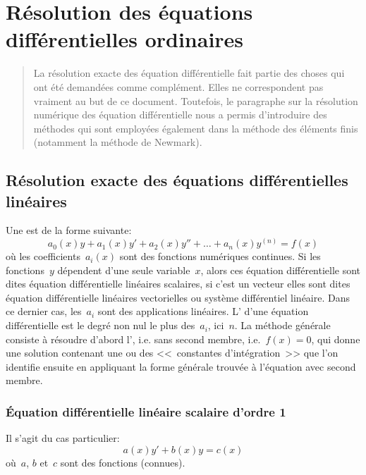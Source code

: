 \chapter{Résolution des équations différentielles ordinaires}\label{Ch-ED} 
\begin{abstract} La résolution exacte des équation différentielle fait partie des choses qui ont été demandées comme complément. Elles ne correspondent pas vraiment au but de ce document. Toutefois, le paragraphe sur la résolution numérique des équation différentielle nous a permis d'introduire des méthodes qui sont employées également dans la méthode des éléments finis (notamment la méthode de Newmark). 
\end{abstract} 
\section{Résolution exacte des équations différentielles linéaires} Une  est de la forme suivante:
\begin{equation}
a_0(x) y + a_1(x) y' + a_2(x) y'' + \ldots + a_n(x) y^{(n)}= f(x)
\end{equation}
où les coefficients~$a_i(x)$ sont des fonctions numériques continues. Si les fonctions~$y$ dépendent d'une seule variable~$x$, alors ces équation différentielle sont dites équation différentielle linéaires scalaires, si c'est un vecteur elles sont dites équation différentielle linéaires vectorielles ou système différentiel linéaire. Dans ce dernier cas, les~$a_i$ sont des applications linéaires. L' d'une équation différentielle est le degré non nul le plus des~$a_i$, ici~$n$. 
 La méthode générale consiste à résoudre d'abord l', i.e. sans second membre, i.e.~$f(x)=0$, qui donne une solution contenant une ou des <<~constantes d'intégration~>> que l'on identifie ensuite en appliquant la forme générale trouvée à l'équation avec second membre. 
 
\subsection{Équation différentielle linéaire scalaire d'ordre 1} 
Il s'agit du cas particulier:
\begin{equation}
a(x)y' + b(x)y = c(x)
\end{equation}
où~$a$, $b$ et~$c$ sont des fonctions (connues). 
